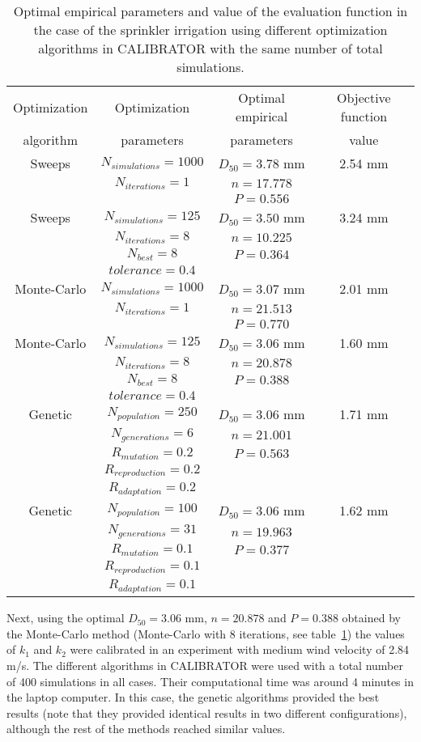 \documentclass[review,authoryear]{elsarticle}
\newcommand{\TABLE}[5]
{
	\begin{table}[ht!]
		\centering
		\caption{#4.\label{#5}}
		#1
		\begin{tabular}{#2}
			#3
		\end{tabular}
	\end{table}
}
\begin{document}
\TABLE{\scriptsize}{cccc}
{
	Optimization & Optimization & Optimal empirical & Objective function
	\\ algorithm & parameters & parameters & value
	\\ \hline
	Sweeps & $N_{simulations}=1000$ & $D_{50}=3.78$ mm & 2.54 mm
	\\ & $N_{iterations}=1$ & $n=17.778$
	\\ & & $P=0.556$
	\\ \hline
	Sweeps & $N_{simulations}=125$ & $D_{50}=3.50$ mm & 3.24 mm
	\\ & $N_{iterations}=8$ & $n=10.225$
	\\ & $N_{best}=8$ & $P=0.364$
	\\ & $tolerance=0.4$
	\\ \hline
	Monte-Carlo & $N_{simulations}=1000$ & $D_{50}=3.07$ mm & 2.01 mm
	\\ & $N_{iterations}=1$ & $n=21.513$
	\\ & & $P=0.770$
	\\ \hline
	Monte-Carlo & $N_{simulations}=125$ & $D_{50}=3.06$ mm & 1.60 mm
	\\ & $N_{iterations}=8$ & $n=20.878$
	\\ & $N_{best}=8$ & $P=0.388$
	\\ & $tolerance=0.4$
	\\ \hline
	Genetic & $N_{population}=250$ & $D_{50}=3.06$ mm & 1.71 mm
	\\ & $N_{generations}=6$ & $n=21.001$
	\\ & $R_{mutation}=0.2$ & $P=0.563$
	\\ & $R_{reproduction}=0.2$
	\\ & $R_{adaptation}=0.2$
	\\ \hline
	Genetic & $N_{population}=100$ & $D_{50}=3.06$ mm & 1.62 mm
	\\ & $N_{generations}=31$ & $n=19.963$
	\\ & $R_{mutation}=0.1$ & $P=0.377$
	\\ & $R_{reproduction}=0.1$
	\\ & $R_{adaptation}=0.1$
	\\ \hline
}{Optimal empirical parameters and value of the evaluation function in the case of the sprinkler irrigation
using different optimization algorithms in CALIBRATOR with the same number of total simulations}{TabSprinklerI}

Next, using the optimal $D_{50}=3.06$ mm, $n=20.878$ and $P=0.388$ obtained by the Monte-Carlo method (Monte-Carlo with 8 iterations, see table~\ref{TabSprinklerI}) the values of $k_1$ and $k_2$ were calibrated in an experiment with medium wind velocity of 2.84 m/s. The different algorithms in CALIBRATOR were used with a total number of 400 simulations in all cases. Their computational time was around 4 minutes in the laptop computer. In this case, the genetic algorithms provided the best results  (note that they provided identical results in two different configurations), although the rest of the methods reached similar values.
\end{document}
